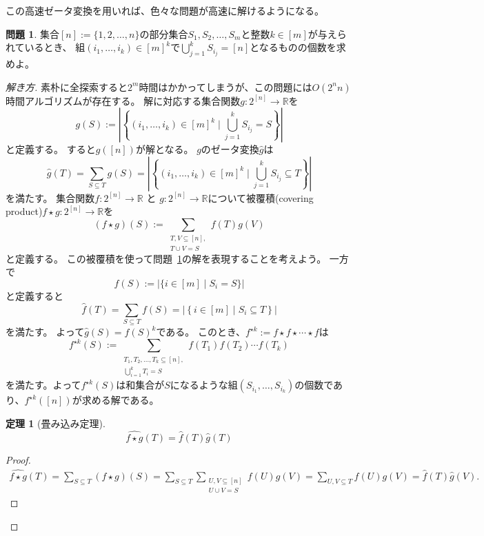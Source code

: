 \documentclass[a4paper,twoside,onecolumn,openany,article,10pt]{memoir}
\newtheorem{theorem}{定理}
\theoremstyle{definition}
\newtheorem{problem}{問題}
\theoremstyle{remark}
\begin{document}
この高速ゼータ変換を用いれば、色々な問題が高速に解けるようになる。
\begin{problem}\label{prob:c}
集合$[n]:=\{1,2,\dotsc,n\}$の部分集合$S_1,S_2,\dotsc,S_m$と整数$k\in[m]$が与えられているとき、
組$(i_1,\dotsc,i_k)\in[m]^k$で$\bigcup_{j=1}^k S_{i_j}=[n]$となるものの個数を求めよ。
\end{problem}
\begin{proof}[解き方]
素朴に全探索すると$2^m$時間はかかってしまうが、この問題には$O(2^nn)$時間アルゴリズムが存在する。
解に対応する集合関数$g\colon 2^{[n]}\to\mathbb{R}$を
\begin{equation*}
g(S):= \left|\left\{(i_1,\dotsc,i_k)\in[m]^k\mid \bigcup_{j=1}^k S_{i_j} = S\right\}\right|
\end{equation*}
と定義する。
すると$g([n])$が解となる。
$g$のゼータ変換$\widehat{g}$は
\begin{equation*}
\widehat{g}(T)= \sum_{S\subseteq T}g(S)=\left|\left\{(i_1,\dotsc,i_k)\in[m]^k\mid \bigcup_{j=1}^k S_{i_j} \subseteq T\right\}\right|
\end{equation*}
を満たす。
集合関数$f\colon 2^{[n]}\to\mathbb{R}$ と $g\colon 2^{[n]}\to \mathbb{R}$について被覆積(covering product)$f\star g\colon 2^{[n]}\to\mathbb{R}$を
\begin{equation*}
(f\star g)(S) := \sum_{\substack{T, V\subseteq[n],\\ T\cup V = S}} f(T) g(V)
\end{equation*}
と定義する。
この被覆積を使って問題~\ref{prob:c}の解を表現することを考えよう。
\fi
一方で
\begin{equation*}
f(S):= \left|\{i\in[m]\mid S_i = S\}\right|
\end{equation*}
と定義すると
\begin{equation*}
\widehat{f}(T) = \sum_{S\subseteq T}f(S) =
\left|\left\{i\in[m] \mid S_i\subseteq T\right\}\right|
\end{equation*}
を満たす。
よって$\widehat{g}(S)=\widehat{f}(S)^k$である。
このとき、$f^{\star k} := f\star f\star \dotsm \star f$は
\begin{equation*}
f^{\star k}(S) := \sum_{\substack{T_1, T_2,\dotsc, T_k\subseteq[n],\\ \bigcup_{i=1}^k T_i = S}} f(T_1)f(T_2)\dotsm f(T_k)
\end{equation*}
を満たす。よって$f^{\star k}(S)$は和集合が$S$になるような組$(S_{i_1},\dotsc,S_{i_k})$の個数であり、$f^{\star k}([n])$が求める解である。


\begin{theorem}[畳み込み定理]
\begin{equation*}
\widehat{f\star g}(T) = \widehat{f}(T)\widehat{g}(T)
\end{equation*}
\end{theorem}
\begin{proof}
\begin{align*}
\widehat{f\star g}(T) = 
\sum_{S\subseteq T} (f\star g)(S)
=
\sum_{S\subseteq T} 
\sum_{\substack{U, V\subseteq [n]\\ U\cup V = S}} f(U) g(V)
=
\sum_{U, V\subseteq T} f(U) g(V)
=\widehat{f}(T)\widehat{g}(V).
\end{align*}
\end{proof}
\fi


\end{proof}
\end{document}
